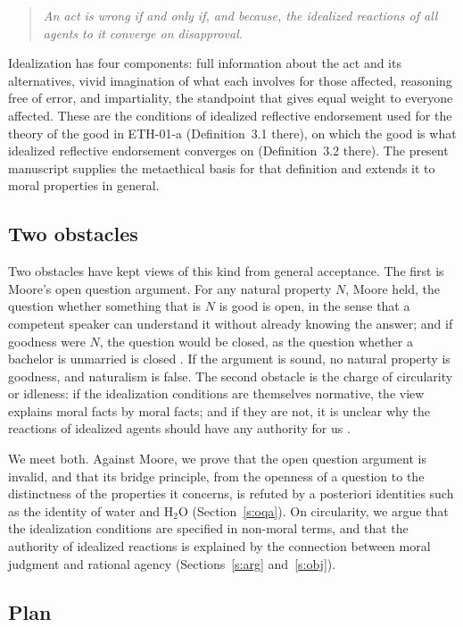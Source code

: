 \documentclass{situationist-preprint}
\begin{document}
\begin{quote}
\emph{An act is wrong if and only if, and because, the idealized reactions of all agents to it converge on disapproval.}
\end{quote}

Idealization has four components: full information about the act and its alternatives, vivid imagination of what each involves for those affected, reasoning free of error, and impartiality, the standpoint that gives equal weight to everyone affected. These are the conditions of idealized reflective endorsement used for the theory of the good in ETH-01-a (Definition~3.1 there), on which the good is what idealized reflective endorsement converges on (Definition~3.2 there). The present manuscript supplies the metaethical basis for that definition and extends it to moral properties in general.

\subsection{Two obstacles}

Two obstacles have kept views of this kind from general acceptance. The first is Moore's open question argument. For any natural property $N$, Moore held, the question whether something that is $N$ is good is open, in the sense that a competent speaker can understand it without already knowing the answer; and if goodness were $N$, the question would be closed, as the question whether a bachelor is unmarried is closed \citep[\S 13]{Moore1903}. If the argument is sound, no natural property is goodness, and naturalism is false. The second obstacle is the charge of circularity or idleness: if the idealization conditions are themselves normative, the view explains moral facts by moral facts; and if they are not, it is unclear why the reactions of idealized agents should have any authority for us \citep{Enoch2011,Parfit2011}.

We meet both. Against Moore, we prove that the open question argument is invalid, and that its bridge principle, from the openness of a question to the distinctness of the properties it concerns, is refuted by a posteriori identities such as the identity of water and H$_2$O (Section~\ref{s:oqa}). On circularity, we argue that the idealization conditions are specified in non-moral terms, and that the authority of idealized reactions is explained by the connection between moral judgment and rational agency (Sections~\ref{s:arg} and~\ref{s:obj}).

\subsection{Plan}
\end{document}
